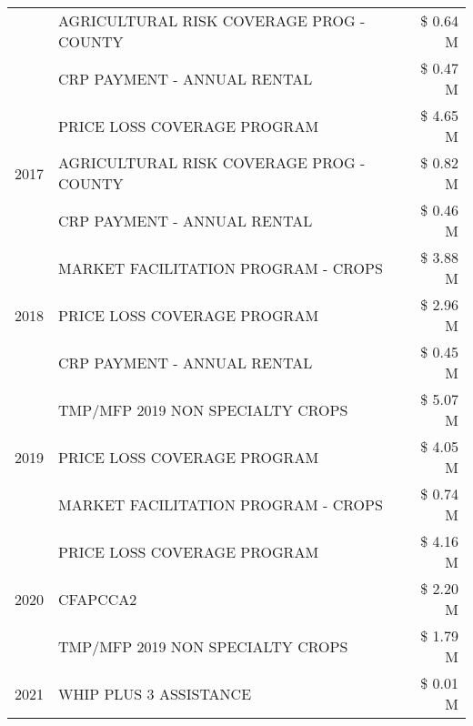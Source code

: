 \begin{tabular}{llr}
 & AGRICULTURAL RISK COVERAGE PROG - COUNTY      & \$ 0.64 M \\
 & CRP PAYMENT - ANNUAL RENTAL                   & \$ 0.47 M \\
\cline{1-3}
\multirow[t]{3}{*}{2017} & PRICE LOSS COVERAGE PROGRAM & \$ 4.65 M \\
 & AGRICULTURAL RISK COVERAGE PROG - COUNTY & \$ 0.82 M \\
 & CRP PAYMENT - ANNUAL RENTAL & \$ 0.46 M \\
\cline{1-3}
\multirow[t]{3}{*}{2018} & MARKET FACILITATION PROGRAM - CROPS & \$ 3.88 M \\
 & PRICE LOSS COVERAGE PROGRAM & \$ 2.96 M \\
 & CRP PAYMENT - ANNUAL RENTAL & \$ 0.45 M \\
\cline{1-3}
\multirow[t]{3}{*}{2019} & TMP/MFP 2019 NON SPECIALTY CROPS & \$ 5.07 M \\
 & PRICE LOSS COVERAGE PROGRAM & \$ 4.05 M \\
 & MARKET FACILITATION PROGRAM - CROPS & \$ 0.74 M \\
\cline{1-3}
\multirow[t]{3}{*}{2020} & PRICE LOSS COVERAGE PROGRAM & \$ 4.16 M \\
 & CFAPCCA2 & \$ 2.20 M \\
 & TMP/MFP 2019 NON SPECIALTY CROPS & \$ 1.79 M \\
\cline{1-3}
2021 & WHIP PLUS 3 ASSISTANCE & \$ 0.01 M \\
\cline{1-3}
\bottomrule
\end{tabular}
